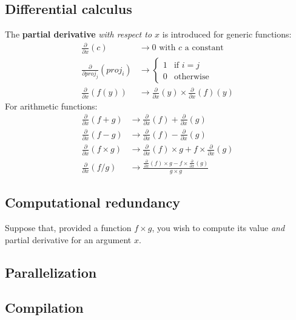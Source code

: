 \documentclass[a4paper]{article}
\begin{document}
\subsection{Differential calculus}

The \textbf{partial derivative} \textit{with respect to $x$} is introduced for generic functions:
\begin{align}
\frac{\partial}{\partial x}(c) &\rightarrow 0 \text{ with $c$ a constant} \\
\frac{\partial}{\partial proj_j}(proj_i) &\rightarrow
\begin{cases}{}
1 & \text{if $i = j$} \\
0 & \text{otherwise}
\end{cases} \\
\frac{\partial}{\partial x}(f(y)) &\rightarrow \frac{\partial}{\partial x}(y) \times \frac{\partial}{\partial x}(f)(y)
\end{align}
For arithmetic functions:
\begin{align}
\frac{\partial}{\partial x}(f + g) &\rightarrow \frac{\partial}{\partial x}(f) + \frac{\partial}{\partial x}(g) \\
\frac{\partial}{\partial x}(f - g) &\rightarrow \frac{\partial}{\partial x}(f) - \frac{\partial}{\partial x}(g) \\
\frac{\partial}{\partial x}(f \times g) &\rightarrow \frac{\partial}{\partial x}(f) \times g + f \times \frac{\partial}{\partial x}(g) \\
\frac{\partial}{\partial x}(f / g) &\rightarrow \frac{\frac{\partial}{\partial x}(f) \times g - f \times \frac{\partial}{\partial x}(g)}{g \times g}
\end{align}

\subsection{Computational redundancy}

Suppose that, provided a function $f \times g$, you wish to compute its value \emph{and} partial derivative for an argument $x$.

\subsection{Parallelization}

\subsection{Compilation}
\end{document}
